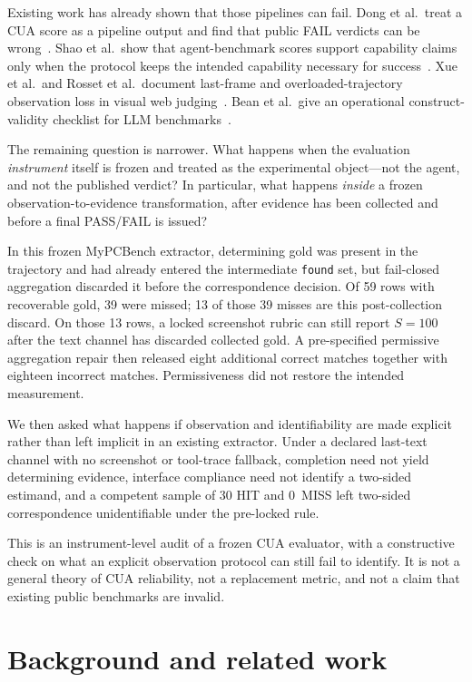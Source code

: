 \documentclass[sigconf,anonymous]{aamas}
\begin{document}
Existing work has already shown that those pipelines can fail.
Dong et al.\ treat a CUA score as a pipeline output and find that public FAIL verdicts can be wrong~\citep{dong2026misscore}.
Shao et al.\ show that agent-benchmark scores support capability claims only when the protocol keeps the intended capability necessary for success~\citep{shao2026protocolvalidity}.
Xue et al.\ and Rosset et al.\ document last-frame and overloaded-trajectory observation loss in visual web judging~\citep{xue2025illusion,rosset2026verifiers}.
Bean et al.\ give an operational construct-validity checklist for LLM benchmarks~\citep{bean2025measuring}.

The remaining question is narrower.
What happens when the evaluation \emph{instrument} itself is frozen and treated as the experimental object---not the agent, and not the published verdict?
In particular, what happens \emph{inside} a frozen observation-to-evidence transformation, after evidence has been collected and before a final PASS/FAIL is issued?

In this frozen MyPCBench extractor, determining gold was present in the trajectory and had already entered the intermediate \texttt{found} set, but fail-closed aggregation discarded it before the correspondence decision.
Of 59 rows with recoverable gold, 39 were missed; 13 of those 39 misses are this post-collection discard.
On those 13 rows, a locked screenshot rubric can still report $S=100$ after the text channel has discarded collected gold.
A pre-specified permissive aggregation repair then released eight additional correct matches together with eighteen incorrect matches.
Permissiveness did not restore the intended measurement.

We then asked what happens if observation and identifiability are made explicit rather than left implicit in an existing extractor.
Under a declared last-text channel with no screenshot or tool-trace fallback, completion need not yield determining evidence, interface compliance need not identify a two-sided estimand, and a competent sample of 30 HIT and 0~MISS left two-sided correspondence unidentifiable under the pre-locked rule.

This is an instrument-level audit of a frozen CUA evaluator, with a constructive check on what an explicit observation protocol can still fail to identify.
It is not a general theory of CUA reliability, not a replacement metric, and not a claim that existing public benchmarks are invalid.

\section{Background and related work}
\label{sec:rw}
\end{document}
